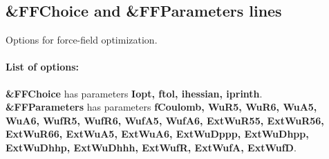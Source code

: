 \documentclass[article,a4paper,twoside]{memoir}
\newcommand{\paramname}[1]{{\color{green}\textbf{#1}}}
\begin{document}
\subsection{\&FFChoice and \&FFParameters lines}
Options for force-field optimization.

\paragraph{List of options:} 

\textbf{\&FFChoice} has parameters \paramname{Iopt, ftol, ihessian, iprinth}.\\
\textbf{\&FFParameters} has parameters \paramname{fCoulomb, WuR5, WuR6, WuA5, WuA6, WufR5, WufR6, WufA5, WufA6, ExtWuR55, ExtWuR56, 
ExtWuR66, ExtWuA5, ExtWuA6, ExtWuDppp, ExtWuDhpp, ExtWuDhhp, ExtWuDhhh, ExtWufR, ExtWufA, ExtWufD}.\\
\end{document}
